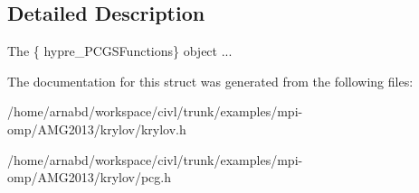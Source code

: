\subsection{Detailed Description}
The \{ hypre\+\_\+\+P\+C\+G\+S\+Functions\} object ... 

The documentation for this struct was generated from the following files\+:\begin{DoxyCompactItemize}
\item 
/home/arnabd/workspace/civl/trunk/examples/mpi-\/omp/\+A\+M\+G2013/krylov/krylov.\+h\item 
/home/arnabd/workspace/civl/trunk/examples/mpi-\/omp/\+A\+M\+G2013/krylov/pcg.\+h\end{DoxyCompactItemize}
